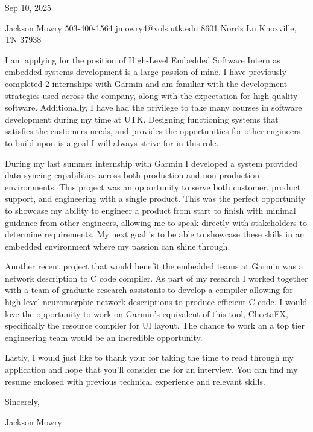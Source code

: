 \documentclass[11pt]{article}
\date{\today}
\title{}
\begin{document}
Sep 10, 2025

Jackson Mowry
503-400-1564
jmowry4@vols.utk.edu
8601 Norris Ln Knoxville, TN 37938



I am applying for the position of High-Level Embedded Software Intern as embedded systems development is a large passion of mine. I have previously completed 2 internships with Garmin and am familiar with the development strategies used across the company, along with the expectation for high quality software. Additionally, I have had the privilege to take many courses in software development during my time at UTK. Designing functioning systems that satisfies the customers needs, and provides the opportunities for other engineers to build upon is a goal I will always strive for in this role.

During my last summer internship with Garmin I developed a system provided data syncing capabilities across both production and non-production environments. This project was an opportunity to serve both customer, product support, and engineering with a single product. This was the perfect opportunity to showcase my ability to engineer a product from start to finish with minimal guidance from other engineers, allowing me to speak directly with stakeholders to determine requirements. My next goal is to be able to showcase these skills in an embedded environment where my passion can shine through.

Another recent project that would benefit the embedded teams at Garmin was a network description to C code compiler. As part of my research I worked together with a team of graduate research assistants to develop a compiler allowing for high level neuromorphic network descriptions to produce efficient C code. I would love the opportunity to work on Garmin's equivalent of this tool, CheetaFX, specifically the resource compiler for UI layout. The chance to work an a top tier engineering team would be an incredible opportunity.

Lastly, I would just like to thank your for taking the time to read through my application and hope that you'll consider me for an interview. You can find my resume enclosed with previous technical experience and relevant skills.

Sincerely,

Jackson Mowry
\end{document}
